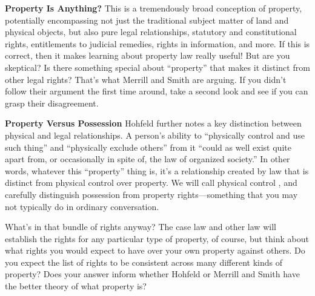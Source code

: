 \item \textbf{Property Is Anything?}
This is a tremendously broad conception of property, potentially encompassing
not just the traditional subject matter of land and physical objects, but also
pure legal relationships, statutory and constitutional rights, entitlements to
judicial remedies, rights in information, and more. If this is correct, then it
makes learning about property law really useful! But are you skeptical? Is there
something special about ``property'' that makes it distinct from other legal
rights? That's what Merrill and Smith are arguing. If you didn't follow their
argument the first time around, take a second look and see if you can grasp
their disagreement.

\item \textbf{Property Versus Possession}
Hohfeld further notes a key distinction between physical and legal
relationships. A person's ability to ``physically control and use such thing''
and ``physically exclude others'' from it ``could as well exist quite apart
from, or occasionally in spite of, the law of organized society.'' In other
words, whatever this ``property'' thing is, it's a relationship created by law
that is distinct from physical control over property. We will call physical
control , and carefully distinguish possession from property
rights---something that you may not typically do in ordinary conversation.


\item What's in that bundle of rights anyway? The case law and other law will
establish the rights for any particular type of property, of course, but think
about what rights you would expect to have over your own property against
others. Do you expect the list of rights to be consistent across many different
kinds of property? Does your answer inform whether Hohfeld or Merrill and Smith
have the better theory of what property is?

